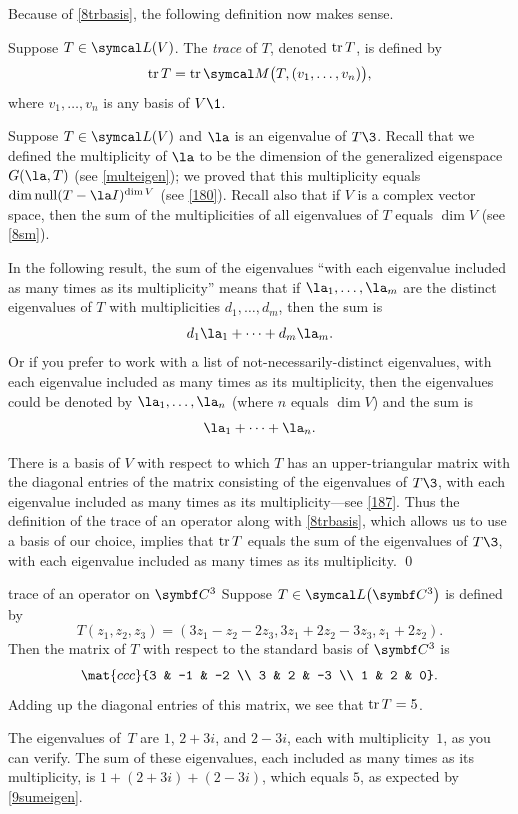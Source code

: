 Because of \ref{8trbasis}, the following definition now makes sense.

{Suppose $T \in \L(V)$. The\/ \emph{trace} of $T$, denoted $\operatorname{tr} T$, is defined by
\[
\tr T = \tr \M\paren[\big]{ T, (v_1, \ldots, v_n) },
\]
where $v_1, \ldots, v_n$ is any basis of $V\1$.}

Suppose $T \in \L(V)$ and $\la$ is an eigenvalue of $T\3$. Recall that we defined the multiplicity of $\la$ to be the dimension of the generalized eigenspace $G(\la, T)$ (see \ref{multeigen});  we proved that this multiplicity equals $\dim \ker(T - \la I)^{\dim V}$ (see \ref{180}). Recall also that if $V$ is a complex vector space, then the sum of the multiplicities of all eigenvalues of $T$ equals $\dim V$ (see \ref{8sm}).

In the following result, the sum of the eigenvalues ``with each eigenvalue included as many times as its multiplicity'' means that if
$\la_1, \dots, \la_m$ are the distinct eigenvalues of $T$ with multiplicities $d_1, \dots, d_m$, then the sum is
\[
d_1 \la_1 + \dots + d_m \la_m.
\]
Or if you prefer to work with a list of not-necessarily-distinct eigenvalues, with each eigenvalue included as many times as its multiplicity, then the eigenvalues could be denoted by $\la_1, \dots, \la_n$ (where $n$ equals $\dim V$) and the sum is
\[
\la_1 + \dots + \la_n.
\]

\pagebreak[3]


\proof
There is a basis of $V$ with respect to which $T$ has an upper-triangular matrix with the diagonal entries of the matrix consisting of the eigenvalues of $T\3$, with each eigenvalue included as many times as its multiplicity---see \ref{187}. Thus the definition of the trace of an operator along with \ref{8trbasis}, which allows us to use a basis of our choice, implies that $\operatorname{tr} T$ equals the sum of the eigenvalues of $T\3$, with each eigenvalue included as many times as its multiplicity.
\qed

\begin{example}{trace of an operator on\/ $\C3$}
Suppose $T \in \L\paren[\big]{\C{3}}$ is defined by
\[
T(z_1, z_2, z_3) = (3z_1 - z_2 - 2z_3, 3z_1 + 2z_2 - 3z_3, z_1 + 2z_2).
\]
Then the matrix of $T$ with respect to the standard basis of $\C3$ is
\[
\mat{ccc}{3 & -1 & -2 \\ 3 & 2 & -3 \\ 1 & 2 & 0}.
\]
Adding up the diagonal entries of this matrix, we see that $\operatorname{tr} T = 5$.

The eigenvalues of~$T$ are $1$, $2+3i$, and $2-3i$, each with multiplicity~$1$, as you can verify. The sum of these eigenvalues, each included as many times as its multiplicity, is $1 + (2 + 3i) + (2 - 3i)$, which equals $5$, as expected by \ref{9sumeigen}.
\end{example}

